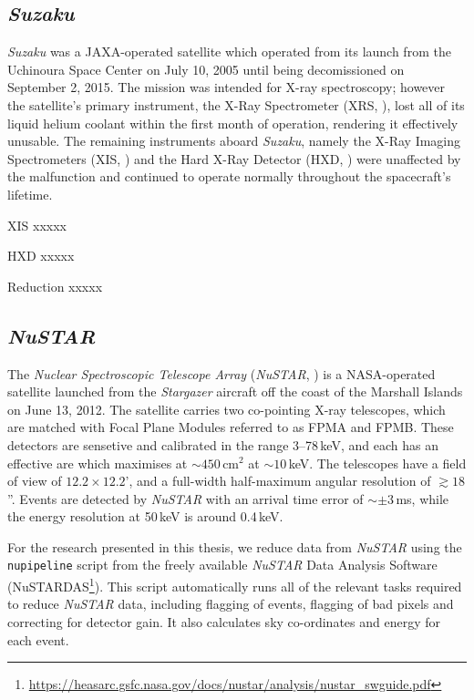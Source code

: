 \subsection{\textit{Suzaku}}

\par \textit{Suzaku} \citep{Mitsuda_Suzaku} was a JAXA-operated satellite which operated from its launch from the Uchinoura Space Center on July 10, 2005 until being decomissioned on September 2, 2015.  The mission was intended for X-ray spectroscopy; however the satellite's primary instrument, the X-Ray Spectrometer (XRS, \citealp{Kelley_XRS}), lost all of its liquid helium coolant within the first month of operation, rendering it effectively unusable.  The remaining instruments aboard \textit{Suzaku}, namely the X-Ray Imaging Spectrometers (XIS, \citealp{Koyama_XIS}) and the Hard X-Ray Detector (HXD, \citealp{Takahashi_HXD}) were unaffected by the malfunction and continued to operate normally throughout the spacecraft's lifetime.
\par XIS xxxxx
\par HXD xxxxx
\par Reduction xxxxx

\subsection{\textit{NuSTAR}}

\par The \textit{Nuclear Spectroscopic Telescope Array} (\textit{NuSTAR}, \citealp{Harrison_NuStar}) is a NASA-operated satellite launched from the \textit{Stargazer} aircraft off the coast of the Marshall Islands on June 13, 2012.  The satellite carries two co-pointing X-ray telescopes, which are matched with Focal Plane Modules referred to as FPMA and FPMB.  These detectors are sensetive and calibrated in the range 3--78\,keV, and each has an effective are which maximises at $\sim450$\,cm$^2$ at $\sim10$\,keV.  The telescopes have a field of view of $12.2\times12.2$', and a full-width half-maximum angular resolution of $\gtrsim18$''.  Events are detected by \textit{NuSTAR} with an arrival time error of $\sim\pm3$\,ms, while the energy resolution at 50\,keV is around 0.4\,keV.
\par For the research presented in this thesis, we reduce data from \textit{NuSTAR} using the \texttt{nupipeline} script from the freely available \textit{NuSTAR} Data Analysis Software (NuSTARDAS\footnote{\url{https://heasarc.gsfc.nasa.gov/docs/nustar/analysis/nustar_swguide.pdf}}).  This script automatically runs all of the relevant tasks required to reduce \textit{NuSTAR} data, including flagging of events, flagging of bad pixels and correcting for detector gain.  It also calculates sky co-ordinates and energy for each event.

